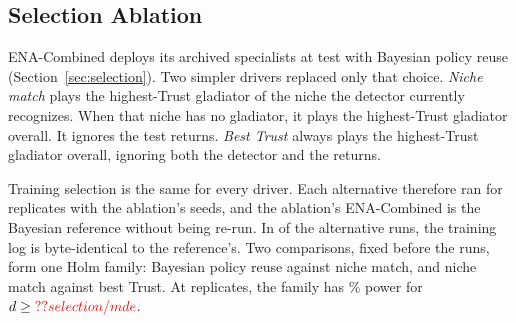 

\subsection{Selection Ablation}
\label{sec:selection_ablation}
ENA-Combined deploys its archived specialists at test with Bayesian policy reuse (Section~\ref{sec:selection}). Two simpler drivers replaced only that choice. \textit{Niche match} plays the highest-Trust gladiator of the niche the detector currently recognizes. When that niche has no gladiator, it plays the highest-Trust gladiator overall. It ignores the test returns. \textit{Best Trust} always plays the highest-Trust gladiator overall, ignoring both the detector and the returns.

Training selection is the same for every driver. Each alternative therefore ran for  replicates with the ablation's seeds, and the ablation's ENA-Combined is the Bayesian reference without being re-run. In  of the  alternative runs, the training log is byte-identical to the reference's. Two comparisons, fixed before the runs, form one Holm family: Bayesian policy reuse against niche match, and niche match against best Trust. At  replicates, the family has \% power for $d \ge \Res{selection/mde}$.

